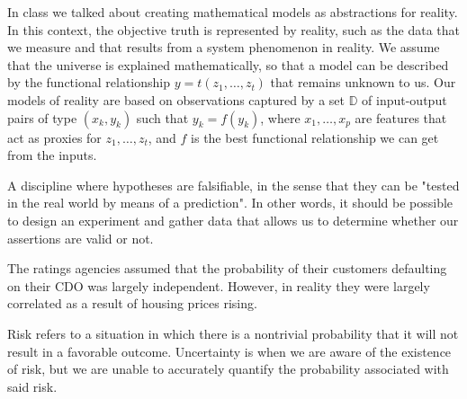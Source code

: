 \documentclass[12pt]{article}
\begin{document}
\begin{enumerate}
In class we talked about creating mathematical models as abstractions for reality.
In this context, the objective truth is represented by reality, such as the data
that we measure and that results from a system phenomenon in reality.
We assume that the universe is explained mathematically, so that a model
can be described by the functional relationship $y=t(z_1,\ldots,z_t)$ that remains
unknown to us. Our models of reality are based on observations captured by a set
$\mathbb{D}$ of input-output pairs of type $(x_k,y_k)$ such that $y_k=f(y_k)$, where
$x_1,\ldots,x_p$ are features that act as proxies for $z_1,\ldots,z_t$, and
$f$ is the best functional relationship we can get from the inputs.


A discipline where hypotheses are falsifiable, in the sense that they can be "tested in the
real world by means of a prediction". In other words, it should be possible to design
an experiment and gather data that allows us to determine whether our assertions are
valid or not.


The ratings agencies assumed that the probability of their customers defaulting on their
CDO was largely independent. However, in reality they were largely correlated
as a result of housing prices rising.


Risk refers to a situation in which there is a nontrivial probability that it
will not result in a favorable outcome. Uncertainty is when we are aware of
the existence of risk, but we are unable to accurately quantify the probability
associated with said risk.



\end{enumerate}
\end{document}

